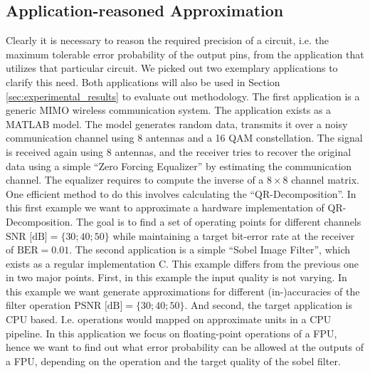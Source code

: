 \documentclass[conference]{IEEEtran}
\begin{document}
\subsection{Application-reasoned Approximation}
Clearly it is necessary to reason the required precision of a circuit, i.e. the maximum tolerable error probability of the output pins, from the application that utilizes that particular circuit. We picked out two exemplary applications to clarify this need. Both applications will also be used in Section \ref{sec:experimental_results} to evaluate out methodology. The first application is a generic MIMO wireless communication system. The application exists as a MATLAB model. The model generates random data, transmits it over a noisy communication channel using 8 antennas and a 16 QAM constellation. The signal is received again using 8 antennas, and the receiver tries to recover the original data using a simple ``Zero Forcing Equalizer'' by estimating the communication channel. The equalizer requires to compute the inverse of a $8\times8$ channel matrix. One efficient method to do this involves calculating the ``QR-Decomposition''. In this first example we want to approximate a hardware implementation of QR-Decomposition. The goal is to find a set of operating points for different channels \mbox{$\textrm{SNR [dB]} = \{30; 40; 50\}$} while maintaining a target bit-error rate at the receiver of \mbox{$\textrm{BER}=0.01$}. The second application is a simple ``Sobel Image Filter'', which exists as a regular implementation C. This example differs from the previous one in two major points. First, in this example the input quality is not varying. In this example we want generate approximations for different (in-)accuracies of the filter operation \mbox{$\textrm{PSNR [dB]} = \{30; 40; 50\}$}. And second, the target application is CPU based. I.e. operations would mapped on approximate units in a CPU pipeline. In this application we focus on floating-point operations of a FPU, hence we want to find out what error probability can be allowed at the outputs of a FPU, depending on the operation and the target quality of the sobel filter.
\end{document}
